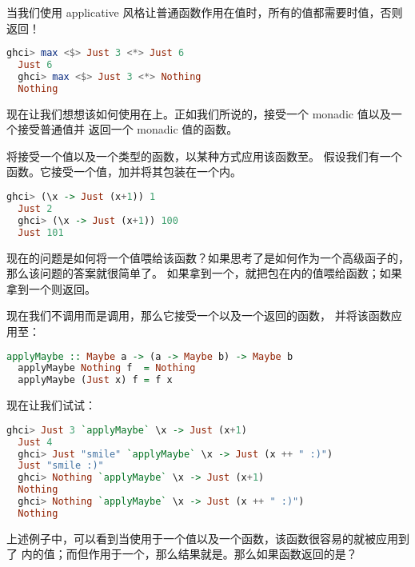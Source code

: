 \documentclass[./main.tex]{subfiles}
\begin{document}
当我们使用 applicative 风格让普通函数作用在值时，所有的值都需要时值，否则返回！

\begin{lstlisting}[language=Haskell]
  ghci> max <$> Just 3 <*> Just 6
  Just 6
  ghci> max <$> Just 3 <*> Nothing
  Nothing
\end{lstlisting}

现在让我们想想该如何使用\acode{>>=}在上。正如我们所说的，\acode{>>=}接受一个 monadic 值以及一个接受普通值并
返回一个 monadic 值的函数。

\acode{>>=}将接受一个值以及一个类型的函数，以某种方式应用该函数至。
假设我们有一个函数。它接受一个值，加并将其包装在一个内。

\begin{lstlisting}[language=Haskell]
  ghci> (\x -> Just (x+1)) 1
  Just 2
  ghci> (\x -> Just (x+1)) 100
  Just 101
\end{lstlisting}

现在的问题是如何将一个值喂给该函数？如果思考了是如何作为一个高级函子的，那么该问题的答案就很简单了。
如果拿到一个，就把包在内的值喂给函数；如果拿到一个则返回。

现在我们不调用\acode{>>=}而是调用，那么它接受一个以及一个返回的函数，
并将该函数应用至：

\begin{lstlisting}[language=Haskell]
  applyMaybe :: Maybe a -> (a -> Maybe b) -> Maybe b
  applyMaybe Nothing f  = Nothing
  applyMaybe (Just x) f = f x
\end{lstlisting}

现在让我们试试：

\begin{lstlisting}[language=Haskell]
  ghci> Just 3 `applyMaybe` \x -> Just (x+1)
  Just 4
  ghci> Just "smile" `applyMaybe` \x -> Just (x ++ " :)")
  Just "smile :)"
  ghci> Nothing `applyMaybe` \x -> Just (x+1)
  Nothing
  ghci> Nothing `applyMaybe` \x -> Just (x ++ " :)")
  Nothing
\end{lstlisting}

上述例子中，可以看到当使用于一个值以及一个函数，该函数很容易的就被应用到了
内的值；而但作用于一个，那么结果就是。那么如果函数返回的是？
\end{document}
